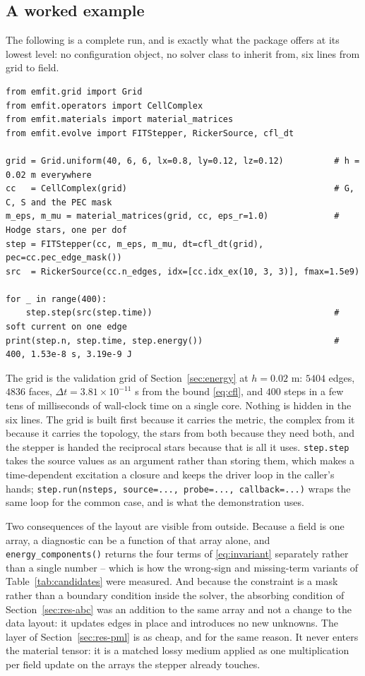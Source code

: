 \subsection{A worked example}
\label{sec:api}

The following is a complete run, and is exactly what the package offers at its lowest level: no configuration
object, no solver class to inherit from, six lines from grid to field.

\begin{lstlisting}[style=python]
from emfit.grid import Grid
from emfit.operators import CellComplex
from emfit.materials import material_matrices
from emfit.evolve import FITStepper, RickerSource, cfl_dt

grid = Grid.uniform(40, 6, 6, lx=0.8, ly=0.12, lz=0.12)          # h = 0.02 m everywhere
cc   = CellComplex(grid)                                         # G, C, S and the PEC mask
m_eps, m_mu = material_matrices(grid, cc, eps_r=1.0)             # Hodge stars, one per dof
step = FITStepper(cc, m_eps, m_mu, dt=cfl_dt(grid), pec=cc.pec_edge_mask())
src  = RickerSource(cc.n_edges, idx=[cc.idx_ex(10, 3, 3)], fmax=1.5e9)

for _ in range(400):
    step.step(src(step.time))                                    # soft current on one edge
print(step.n, step.time, step.energy())                          # 400, 1.53e-8 s, 3.19e-9 J
\end{lstlisting}

The grid is the validation grid of Section~\ref{sec:energy} at $h=0.02$ m: $5404$ edges, $4836$ faces,
$\Delta t=3.81\times10^{-11}$ s from the bound \eqref{eq:cfl}, and $400$ steps in a few tens of milliseconds of wall-clock
time on a single core. Nothing is hidden in the six lines. The grid is built first because it carries the metric,
the complex from it because it carries the topology, the stars from both because they need both, and the stepper
is handed the reciprocal stars because that is all it uses. \texttt{step.step} takes the source values as an
argument rather than storing them, which makes a time-dependent excitation a closure and keeps the driver loop in
the caller's hands; \texttt{step.run(nsteps, source=..., probe=..., callback=...)} wraps the same loop for the
common case, and is what the demonstration uses.

Two consequences of the layout are visible from outside. Because a field is one array, a diagnostic can be a
function of that array alone, and \texttt{energy\_components()} returns the four terms of \eqref{eq:invariant}
separately rather than a single number -- which is how the wrong-sign and missing-term variants of
Table~\ref{tab:candidates} were measured. And because the constraint is a mask rather than a boundary condition
inside the solver, the absorbing condition of Section~\ref{sec:res-abc} was an addition to the same array and not a
change to the data layout: it updates edges in place and introduces no new unknowns. The layer of
Section~\ref{sec:res-pml} is as cheap, and for the same reason. It never enters the material tensor: it is a matched
lossy medium applied as one multiplication per field update on the arrays the stepper already touches.

